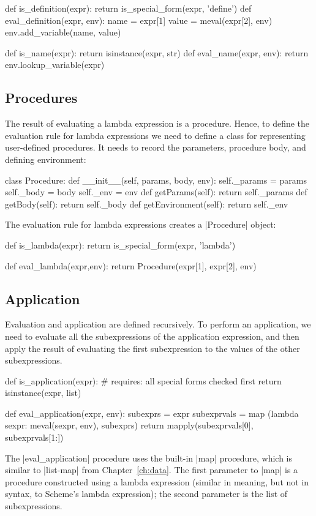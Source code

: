 \begin{pythoncode}
def is_definition(expr): return is_special_form(expr, 'define')
def eval_definition(expr, env):
    name = expr[1]
    value = meval(expr[2], env)
    env.add_variable(name, value)

def is_name(expr): return isinstance(expr, str)
def eval_name(expr, env):
    return env.lookup_variable(expr)
\end{pythoncode}

\subsection{Procedures}

The result of evaluating a lambda expression is a procedure.  Hence, to define the evaluation rule for lambda expressions we need to define a class for representing user-defined procedures.  It needs to record the parameters, procedure body, and defining environment:

\begin{pythoncode}
class Procedure:
    def __init__(self, params, body, env):
        self._params = params
        self._body = body
        self._env = env
    def getParams(self): return self._params
    def getBody(self): return self._body
    def getEnvironment(self): return self._env        
\end{pythoncode}

The evaluation rule for lambda expressions creates a \pycode|Procedure| object:
\begin{pythoncode}
def is_lambda(expr): return is_special_form(expr, 'lambda')

def eval_lambda(expr,env):
    return Procedure(expr[1], expr[2], env)
\end{pythoncode}

\subsection{Application}

Evaluation and application are defined recursively.  To perform an application, we need to evaluate all the subexpressions of the application expression, and then apply the result of evaluating the first subexpression to the values of the other subexpressions.  

\begin{pythoncode}
def is_application(expr): # requires: all special forms checked first
    return isinstance(expr, list)
   
def eval_application(expr, env):
    subexprs = expr
    subexprvals = map (lambda sexpr: meval(sexpr, env), subexprs)
    return mapply(subexprvals[0], subexprvals[1:])
\end{pythoncode}
The \pycode|eval_application| procedure uses the built-in \pycode|map| procedure, which is similar to \scheme|list-map| from Chapter~\ref{ch:data}.  The first parameter to \pycode|map| is a procedure constructed using a lambda expression (similar in meaning, but not in syntax, to Scheme's lambda expression); the second parameter is the list of subexpressions.  

